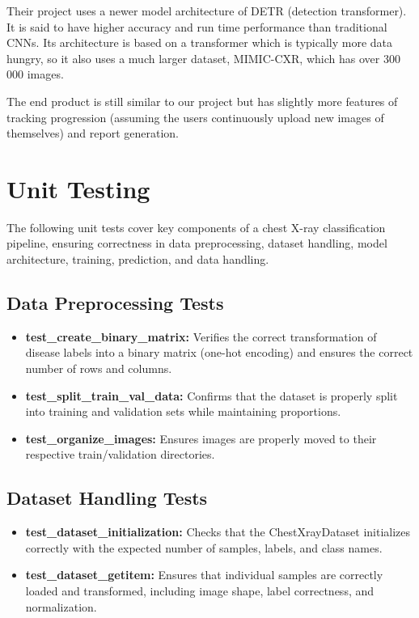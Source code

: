 \documentclass[12pt, titlepage]{article}
\begin{document}
Their project uses a newer model architecture of DETR (detection transformer). It is said to have higher accuracy and run time performance than traditional CNNs. Its architecture is based on a transformer which is typically more data hungry, so it also uses a much larger dataset, MIMIC-CXR, which has over 300 000 images.

The end product is still similar to our project but has slightly more features of tracking progression (assuming the users continuously upload new images of themselves) and report generation.


\section{Unit Testing}
The following unit tests cover key components of a chest X-ray classification pipeline, ensuring correctness in data preprocessing, dataset handling, model architecture, training, prediction, and data handling.

\subsection{Data Preprocessing Tests}
\begin{itemize}
    \item \textbf{test\_create\_binary\_matrix:} Verifies the correct transformation of disease labels into a binary matrix (one-hot encoding) and ensures the correct number of rows and columns.
    \item \textbf{test\_split\_train\_val\_data:} Confirms that the dataset is properly split into training and validation sets while maintaining proportions.
    \item \textbf{test\_organize\_images:} Ensures images are properly moved to their respective train/validation directories.
\end{itemize}

\subsection{Dataset Handling Tests}
\begin{itemize}
    \item \textbf{test\_dataset\_initialization:} Checks that the ChestXrayDataset initializes correctly with the expected number of samples, labels, and class names.
    \item \textbf{test\_dataset\_getitem:} Ensures that individual samples are correctly loaded and transformed, including image shape, label correctness, and normalization.
\end{itemize}
\end{document}
